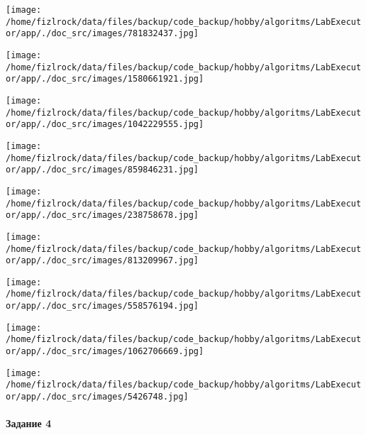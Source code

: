 \documentclass[a4paper, 12pt]{article}
\begin{document}
\texttt{[image: /home/fizlrock/data/files/backup/code\_backup/hobby/algoritms/LabExecutor/app/./doc\_src/images/781832437.jpg]}

\texttt{[image: /home/fizlrock/data/files/backup/code\_backup/hobby/algoritms/LabExecutor/app/./doc\_src/images/1580661921.jpg]}

\texttt{[image: /home/fizlrock/data/files/backup/code\_backup/hobby/algoritms/LabExecutor/app/./doc\_src/images/1042229555.jpg]}

\texttt{[image: /home/fizlrock/data/files/backup/code\_backup/hobby/algoritms/LabExecutor/app/./doc\_src/images/859846231.jpg]}

\texttt{[image: /home/fizlrock/data/files/backup/code\_backup/hobby/algoritms/LabExecutor/app/./doc\_src/images/238758678.jpg]}

\texttt{[image: /home/fizlrock/data/files/backup/code\_backup/hobby/algoritms/LabExecutor/app/./doc\_src/images/813209967.jpg]}

\texttt{[image: /home/fizlrock/data/files/backup/code\_backup/hobby/algoritms/LabExecutor/app/./doc\_src/images/558576194.jpg]}

\texttt{[image: /home/fizlrock/data/files/backup/code\_backup/hobby/algoritms/LabExecutor/app/./doc\_src/images/1062706669.jpg]}

\texttt{[image: /home/fizlrock/data/files/backup/code\_backup/hobby/algoritms/LabExecutor/app/./doc\_src/images/5426748.jpg]}
\pagebreak
\paragraph{Задание 4}
\end{document}
